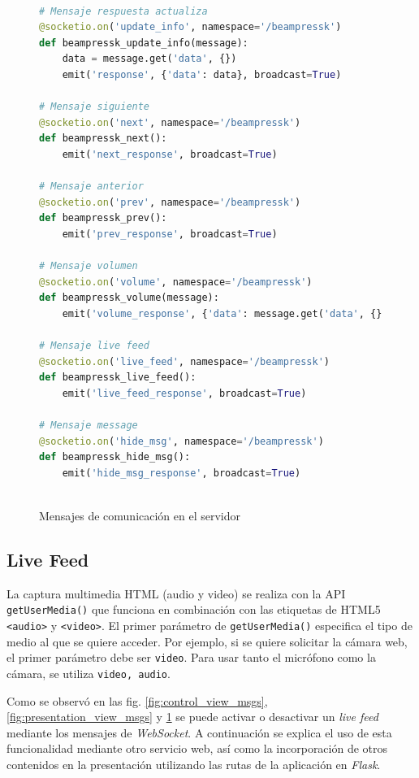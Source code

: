 			\begin{figure}[htb]%
				\begin{lstlisting}[language=Python]%

# Mensaje respuesta actualiza
@socketio.on('update_info', namespace='/beampressk')
def beampressk_update_info(message):
    data = message.get('data', {})
    emit('response', {'data': data}, broadcast=True)

# Mensaje siguiente
@socketio.on('next', namespace='/beampressk')
def beampressk_next():
    emit('next_response', broadcast=True)

# Mensaje anterior
@socketio.on('prev', namespace='/beampressk')
def beampressk_prev():
    emit('prev_response', broadcast=True)

# Mensaje volumen
@socketio.on('volume', namespace='/beampressk')
def beampressk_volume(message):
    emit('volume_response', {'data': message.get('data', {})}, broadcast=True)

# Mensaje live feed
@socketio.on('live_feed', namespace='/beampressk')
def beampressk_live_feed():
    emit('live_feed_response', broadcast=True)

# Mensaje message
@socketio.on('hide_msg', namespace='/beampressk')
def beampressk_hide_msg():
    emit('hide_msg_response', broadcast=True)
  
				\end{lstlisting}
			\caption{Mensajes de comunicación en el servidor}
			\label{fig:server_msgs}
			\end{figure}							


		\subsection{Live Feed} %
		\label{sub:live_feed}

			La captura multimedia HTML (audio y video) se realiza con la API \texttt{getUserMedia()} que funciona en combinación con las etiquetas de HTML5 \texttt{<audio>} y \texttt{<video>}. El primer parámetro de \texttt{getUserMedia()} especifica el tipo de medio al que se quiere acceder. Por ejemplo, si se quiere solicitar la cámara web, el primer parámetro debe ser \texttt{video}. Para usar tanto el micrófono como la cámara, se utiliza \texttt{video, audio}.

			Como se observó en las fig. \ref{fig:control_view_msgs}, \ref{fig:presentation_view_msgs} y \ref{fig:server_msgs} se puede activar o desactivar un \textit{live feed} mediante los mensajes de \textit{WebSocket}. A continuación se explica el uso de esta funcionalidad mediante otro servicio web, así como la incorporación de otros contenidos en la presentación utilizando las rutas de la aplicación en \textit{Flask}.
		
